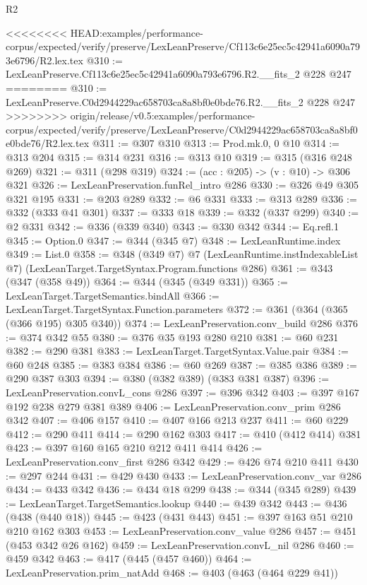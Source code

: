 \begin{lexlean}{R2}
\begin{coremodule}
{{{{{{{<<<<<<<< HEAD:examples/performance-corpus/expected/verify/preserve/LexLeanPreserve/Cf113c6e25ec5c42941a6090a793e6796/R2.lex.tex
@310 := LexLeanPreserve.Cf113c6e25ec5c42941a6090a793e6796.R2.__fits_2 @228 @247
========
@310 := LexLeanPreserve.C0d2944229ac658703ca8a8bf0e0bde76.R2.__fits_2 @228 @247
>>>>>>>> origin/release/v0.5:examples/performance-corpus/expected/verify/preserve/LexLeanPreserve/C0d2944229ac658703ca8a8bf0e0bde76/R2.lex.tex
@311 := @307 @310
@313 := Prod.mk.{0, 0} @10
@314 := @313 @204
@315 := @314 @231
@316 := @313 @10
@319 := @315 (@316 @248 @269)
@321 := @311 (@298 @319)
@324 := (acc : @205) -> (v : @10) -> @306 @321
@326 := LexLeanPreservation.funRel_intro @286
@330 := @326 @49 @305 @321 @195
@331 := @203 @289
@332 := @6 @331
@333 := @313 @289
@336 := @332 (@333 @41 @301)
@337 := @333 @18
@339 := @332 (@337 @299)
@340 := @2 @331
@342 := @336 (@339 @340)
@343 := @330 @342
@344 := Eq.refl.{1}
@345 := Option.{0}
@347 := @344 (@345 @7)
@348 := LexLeanRuntime.index
@349 := List.{0}
@358 := @348
    (@349 @7)
    @7
    (LexLeanRuntime.instIndexableList @7)
    (LexLeanTarget.TargetSyntax.Program.functions @286)
@361 := @343 (@347 (@358 @49))
@364 := @344 (@345 (@349 @331))
@365 := LexLeanTarget.TargetSemantics.bindAll
@366 := LexLeanTarget.TargetSyntax.Function.parameters
@372 := @361 (@364 (@365 (@366 @195) @305 @340))
@374 := LexLeanPreservation.conv_build @286
@376 := @374 @342 @55
@380 := @376 @35 @193 @280 @210
@381 := @60 @231
@382 := @290 @381
@383 := LexLeanTarget.TargetSyntax.Value.pair
@384 := @60 @248
@385 := @383 @384
@386 := @60 @269
@387 := @385 @386
@389 := @290 @387 @303
@394 := @380 (@382 @389) (@383 @381 @387)
@396 := LexLeanPreservation.convL_cons @286
@397 := @396 @342
@403 := @397 @167 @192 @238 @279 @381 @389
@406 := LexLeanPreservation.conv_prim @286 @342
@407 := @406 @157
@410 := @407 @166 @213 @237
@411 := @60 @229
@412 := @290 @411
@414 := @290 @162 @303
@417 := @410 (@412 @414) @381
@423 := @397 @160 @165 @210 @212 @411 @414
@426 := LexLeanPreservation.conv_first @286 @342
@429 := @426 @74 @210 @411
@430 := @297 @244
@431 := @429 @430
@433 := LexLeanPreservation.conv_var @286
@434 := @433 @342
@436 := @434 @18 @299
@438 := @344 (@345 @289)
@439 := LexLeanTarget.TargetSemantics.lookup
@440 := @439 @342
@443 := @436 (@438 (@440 @18))
@445 := @423 (@431 @443)
@451 := @397 @163 @51 @210 @210 @162 @303
@453 := LexLeanPreservation.conv_value @286
@457 := @451 (@453 @342 @26 @162)
@459 := LexLeanPreservation.convL_nil @286
@460 := @459 @342
@463 := @417 (@445 (@457 @460))
@464 := LexLeanPreservation.prim_natAdd
@468 := @403 (@463 (@464 @229 @41))
}}}}}}}
\end{coremodule}
\end{lexlean}

